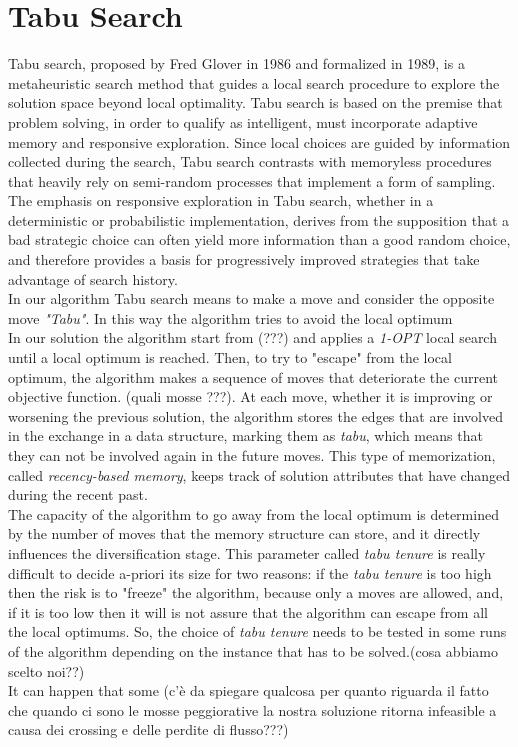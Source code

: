 \newpage
\section{Tabu Search}
Tabu search, proposed by Fred Glover in 1986 and formalized in 1989, is a metaheuristic search method that guides a local search procedure to explore the solution space beyond local optimality. Tabu search is based on the premise that problem solving, in order to qualify as intelligent, must incorporate adaptive memory and responsive exploration. Since local choices are guided by information collected during the search, Tabu search contrasts with memoryless procedures that heavily rely on semi-random processes that implement a form of sampling. The emphasis on responsive exploration in Tabu search, whether in a deterministic or probabilistic implementation, derives from the supposition that a bad strategic choice can often yield more information than a good random choice, and therefore provides a basis for progressively improved strategies that take advantage of search history.\\
In our algorithm Tabu search means to make a move and consider the opposite move \textit{"Tabu"}. In this way the algorithm tries to avoid the local optimum\\
In our solution the algorithm start from (???) and applies a \textit{1-OPT} local search until a local optimum is reached. Then, to try to "escape" from the local optimum, the algorithm makes a sequence of moves that deteriorate the current objective function. (quali mosse ???). At each move, whether it is improving or worsening the previous solution, the algorithm stores the edges that are involved in the exchange in a data structure, marking them as \textit{tabu}, which means that they can not be involved again in the future moves. This type of memorization, called \textit{recency-based memory}, keeps track of solution attributes that have changed during the recent past.\\
The capacity of the algorithm to go away from the local optimum is determined by the number of moves that the memory structure can store, and it directly influences the diversification stage. This parameter called \textit{tabu tenure} is really difficult to decide a-priori its size for two reasons: if the \textit{tabu tenure} is too high then the risk is to "freeze" the algorithm, because only a moves are allowed, and, if it is too low then it will is not assure that the algorithm can escape from all
the local optimums. So, the choice of \textit{tabu tenure} needs to be tested in some runs of the algorithm depending on the instance that has to be solved.(cosa abbiamo scelto noi??)\\
It can happen that some 
(c'è da spiegare qualcosa per quanto riguarda il fatto che quando ci sono le mosse peggiorative la nostra soluzione ritorna infeasible a causa dei crossing e delle perdite di flusso???)
